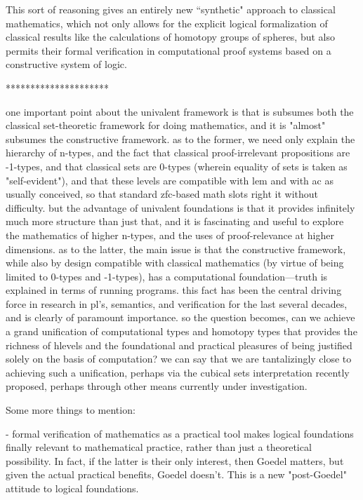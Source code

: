 \documentclass[11pt]{article}
\theoremstyle{remark}
\theoremstyle{definition}
\begin{document}
This sort of reasoning gives an entirely new ``synthetic" approach to classical mathematics, which not only allows for the explicit logical formalization of classical results like the calculations of homotopy groups of spheres, but also permits their formal verification in computational proof systems based on a constructive system of logic.

*********************

one important point about the univalent framework is that is subsumes both the classical set-theoretic framework for doing mathematics, and it is "almost" subsumes the constructive framework.  as to the former, we need only explain the hierarchy of n-types, and the fact that classical proof-irrelevant propositions are -1-types, and that classical sets are 0-types (wherein equality of sets is taken as "self-evident"), and that these levels are compatible with lem and with ac as usually conceived, so that standard zfc-based math slots right it without difficulty.  but the advantage of univalent foundations is that it provides infinitely much more structure than just that, and it is fascinating and useful to explore the mathematics of higher n-types, and the uses of proof-relevance at higher dimensions.  as to the latter, the main issue is that the constructive framework, while also by design compatible with classical mathematics (by virtue of being limited to 0-types and -1-types), has a computational foundation---truth is explained in terms of running programs.  this fact has been the central driving force in research in pl's, semantics, and verification for the last several decades, and is clearly of paramount importance.  so the question becomes, can we achieve a grand unification of computational types and homotopy types that provides the richness of hlevels and the foundational and practical pleasures of being justified solely on the basis of computation?  we can say that we are tantalizingly close to achieving such a unification, perhaps via the cubical sets interpretation recently proposed, perhaps through other means currently under investigation.

Some more things to mention:

- formal verification of mathematics as a practical tool makes logical foundations finally relevant to mathematical practice, rather than just a theoretical possibility.  In fact, if the latter is their only interest, then Goedel matters, but given the actual practical benefits, Goedel doesn't. This is a new "post-Goedel" attitude to logical foundations. 
\end{document}
